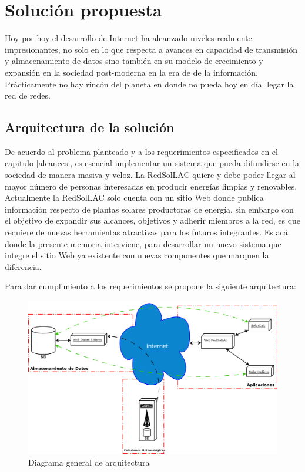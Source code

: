 \chapter{Solución propuesta}
\label{solucion}
Hoy por hoy el desarrollo de Internet ha alcanzado niveles realmente impresionantes, no solo en lo que respecta a avances en capacidad de transmisión y almacenamiento de datos sino también en su modelo de crecimiento y expansión en la sociedad post-moderna en la era de de la información. Prácticamente no hay rincón del planeta en donde no pueda hoy en día llegar la red de redes.\\

\section{Arquitectura de la solución}
\label{arquitectura}
De acuerdo al problema planteado y a los requerimientos especificados en el capitulo \ref{alcances}, es esencial implementar un sistema que pueda difundirse en la sociedad de manera masiva y veloz. La RedSolLAC quiere y debe poder llegar al mayor número de personas interesadas en producir energías limpias y renovables.\\

Actualmente la RedSolLAC solo cuenta con un sitio Web donde publica información respecto de plantas solares productoras de energía, sin embargo con el objetivo de expandir sus alcances, objetivos y adherir miembros a la red, es que requiere de nuevas herramientas atractivas para los futuros integrantes. Es acá donde la presente memoria interviene, para desarrollar un nuevo sistema que integre el sitio Web ya existente con nuevas componentes que marquen la diferencia.

Para dar cumplimiento a los requerimientos se propone la siguiente arquitectura:

\begin{figure}[h!]
        \centering
        \includegraphics[width=400pt]{images/diagramaArquitectura}
        \caption{Diagrama general de arquitectura}
	\label{da}
\end{figure}

